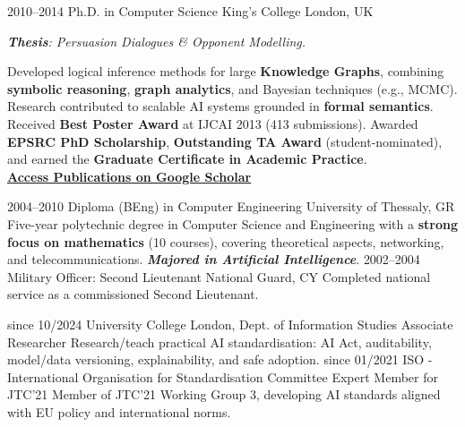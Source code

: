 \documentclass[]{../../friggeri-cv}
\begin{document}
\begin{entrylist2}
    \entrytwo
        {\small 2010--2014}
        {\small Ph.D. in Computer Science}
        {\small King's College London, UK}
        {\small \emph{\textbf{Thesis}: Persuasion Dialogues \& Opponent Modelling.}

        {\footnotesize Developed logical inference methods for large \textbf{Knowledge Graphs}, combining \textbf{symbolic reasoning}, \textbf{graph analytics}, and Bayesian techniques (e.g., MCMC). Research contributed to scalable AI systems grounded in \textbf{formal semantics}. Received \textbf{Best Poster Award} at IJCAI 2013 (413 submissions). Awarded \textbf{EPSRC PhD Scholarship}, \textbf{Outstanding TA Award} (student-nominated), and earned the \textbf{Graduate Certificate in Academic Practice}.
        \\ \textbf{\textcolor{blue}{\href{https://scholar.google.com/citations?hl=en&user=Rr3KTx8AAAAJ}{\underline{Access Publications on Google Scholar}}}}}
        }
    \entrytwo
        {\small  2004--2010}
        {\small Diploma (BEng) in Computer Engineering}
        {\small University of Thessaly, GR}
        {\footnotesize Five-year polytechnic degree in Computer Science and Engineering with a \textbf{strong focus on mathematics} (10 courses), covering theoretical aspects, networking, and telecommunications. \emph{\textbf{Majored in Artificial Intelligence}}.}
    \entrytwo
        {\small  2002--2004}
        {\small Military Officer: Second Lieutenant}
        {\small National Guard, CY}
        {\small Completed national service as a commissioned Second Lieutenant.}
\end{entrylist2}
\begin{entrylist2}
    \entrytwo
        {\footnotesize since 10/2024}
        {\small University College London, Dept. of Information Studies}
        {\small Associate Researcher}
        {\small Research/teach practical AI standardisation: AI Act, auditability, model/data versioning, explainability, and safe adoption.}
    \entrytwo
        {\footnotesize since 01/2021}
        {\small ISO - International Organisation for Standardisation}
        {\small Committee Expert Member for JTC'21}
        {\footnotesize Member of JTC'21 Working Group 3, developing AI standards aligned with EU policy and international norms.}
\end{entrylist2}
\end{document}
